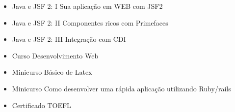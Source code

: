 












\smallskip
\begin{itemize}
\item Java e JSF 2: I Sua aplicação em WEB com JSF2
\smallskip
\item  Java e JSF 2: II Componentes ricos com Primefaces
\smallskip
\item  Java e JSF 2: III Integração com CDI
\smallskip
\item Curso Desenvolvimento Web
\smallskip
\item Minicurso Básico de Latex
\smallskip
\item Minicurso Como desenvolver uma rápida aplicação utilizando
Ruby/rails
\smallskip
\item Certificado TOEFL
\smallskip

\end{itemize}
\bigskip

